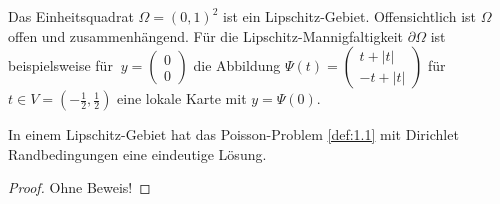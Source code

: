 \begin{Beispiel}
    Das Einheitsquadrat
    $\Omega = (0,1)^2$ ist ein Lipschitz-Gebiet. Offensichtlich ist $\Omega$
    offen und zusammenhängend. Für die Lipschitz-Mannigfaltigkeit $\partial \Omega$ ist
    beispielsweise für
    $\ y =  \left(\begin{smallmatrix}
		0 \\ 0
	    \end{smallmatrix}\right)$
    die Abbildung
    $\Psi(t) = \left(\begin{smallmatrix}
		  t + |t| \\ -t + |t|
              \end{smallmatrix}\right)$
    für $t \in V = (-\frac{1}{2},\frac{1}{2})$ eine lokale Karte mit $y = \Psi(0)$.
\end{Beispiel}


\begin{Satz}
    \label{satz:1.5}
    In einem Lipschitz-Gebiet hat das Poisson-Problem \eqref{def:1.1} mit
    Dirichlet Randbedingungen eine eindeutige Lösung.
\end{Satz}


\begin{proof}
    Ohne Beweis!
\end{proof}
